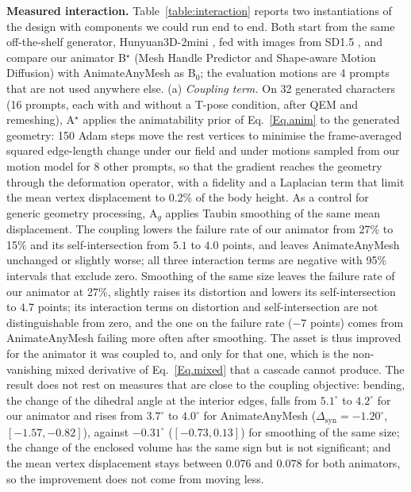 \documentclass[lettersize,journal]{IEEEtran}
\newenvironment{revblock}{\par\color{red}}{\par}
\begin{document}
\begin{revblock}
\textbf{Measured interaction.} Table~\ref{table:interaction} reports two instantiations of the
design with components we could run end to end. Both start from the same off-the-shelf generator,
Hunyuan3D-2mini \cite{zhao2025hunyuan3d}, fed with images from SD1.5 \cite{rombach2022high}, and
compare our animator B$^{\star}$ (Mesh Handle Predictor and Shape-aware Motion Diffusion) with
AnimateAnyMesh \cite{wu2025animateanymesh} as B$_{0}$; the evaluation motions are 4 prompts that
are not used anywhere else. (a) \textit{Coupling term.} On 32 generated characters (16 prompts,
each with and without a T-pose condition, after QEM and remeshing), A$^{\star}$ applies the
animatability prior of Eq.~\ref{Eq.anim} to the generated geometry: 150 Adam steps move the rest
vertices to minimise the frame-averaged squared edge-length change under our field and under
motions sampled from our motion model for 8 other prompts, so that the gradient reaches the
geometry through the deformation operator, with a fidelity and a Laplacian term that limit the
mean vertex displacement to 0.2\% of the body height. As a control for generic geometry
processing, A$_{g}$ applies Taubin smoothing of the same mean displacement. The coupling lowers
the failure rate of our animator from 27\% to 15\% and its self-intersection from $5.1$ to $4.0$
points, and leaves AnimateAnyMesh unchanged or slightly worse; all three interaction terms are
negative with 95\% intervals that exclude zero. Smoothing of the same size leaves the failure
rate of our animator at 27\%, slightly raises its distortion and lowers its self-intersection to
$4.7$ points; its interaction terms on distortion and self-intersection are not distinguishable
from zero, and the one on the failure rate ($-7$ points) comes from AnimateAnyMesh failing more
often after smoothing. The asset is thus improved for the
animator it was coupled to, and only for that one, which is the non-vanishing mixed derivative
of Eq.~\ref{Eq.mixed} that a cascade cannot produce. The result does not rest on measures that
are close to the coupling objective: bending, the change of the dihedral angle at the interior
edges, falls from $5.1^{\circ}$ to $4.2^{\circ}$ for our animator and rises from $3.7^{\circ}$ to
$4.0^{\circ}$ for AnimateAnyMesh ($\Delta_{\text{syn}}=-1.20^{\circ}$, $[-1.57,-0.82]$), against
$-0.31^{\circ}$ ($[-0.73,0.13]$) for smoothing of the same size; the change of the enclosed volume
has the same sign but is not significant; and the mean vertex displacement stays between $0.076$
and $0.078$ for both animators, so the improvement does not come from moving less.

\end{revblock}
\end{document}
